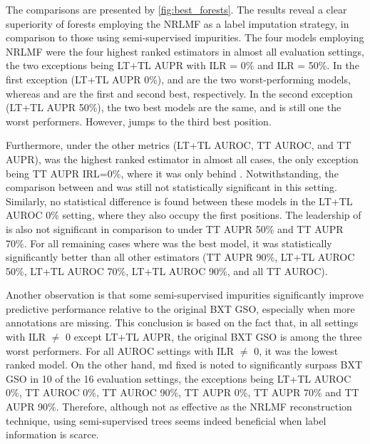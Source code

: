 The comparisons are presented by \autoref{fig:best_forests}. The results reveal a clear superiority of forests employing the NRLMF as a label imputation strategy, in comparison to those using semi-supervised impurities. The four models employing NRLMF were the four highest ranked estimators in almost all evaluation settings, the two exceptions being LT+TL AUPR with ILR = 0\% and ILR = 50\%. In the first exception (LT+TL AUPR 0\%),  and  are the two worst-performing models, whereas  and  are the first and second best, respectively. In the second exception (LT+TL AUPR 50\%), the two best models are the same, and  is still one the worst performers. However,  jumps to the third best position. 


Furthermore, under the other metrics (LT+TL AUROC, TT AUROC, and TT AUPR),  was the highest ranked estimator in almost all cases, the only exception being TT AUPR IRL=0\%, where it was only behind . Notwithstanding, the comparison between  and  was still not statistically significant in this setting. Similarly, no statistical difference is found between these models in the LT+TL AUROC 0\% setting, where they also occupy the first positions. The leadership of  is also not significant in comparison to  under TT AUPR 50\% and TT AUPR 70\%. For all remaining cases where  was the best model, it was statistically significantly better than all other estimators (TT AUPR 90\%, LT+TL AUROC 50\%, LT+TL AUROC 70\%, LT+TL AUROC 90\%, and all TT AUROC).


Another observation is that some semi-supervised impurities significantly improve predictive performance relative to the original BXT GSO, especially when more annotations are missing. This conclusion is based on the fact that, in all settings with ILR $\neq$ 0 except LT+TL AUPR, the original BXT GSO is among the three worst performers. For all AUROC settings with ILR $\neq$ 0, it was the lowest ranked model. On the other hand, md fixed is noted to significantly surpass BXT GSO in 10 of the 16 evaluation settings, the exceptions being LT+TL AUROC 0\%, TT AUROC 0\%, TT AUROC 90\%, TT AUPR 0\%, TT AUPR 70\% and TT AUPR 90\%. Therefore, although not as effective as the NRLMF reconstruction technique, using semi-supervised trees seems indeed beneficial when label information is scarce.

